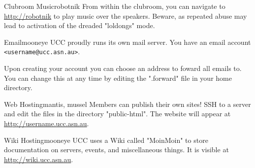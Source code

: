 
\begin{uccservice}{Clubroom Music}{robotnik}
From within the clubroom, you can navigate to \url{http://robotnik} to play music over the speakers. Beware, as repeated abuse may lead to activation of the dreaded "loldongs" mode.
\end{uccservice}

\begin{uccservice}{Email}{mooneye}
UCC proudly runs its own mail server. You have an email account \texttt{<username@ucc.asn.au>}.

Upon creating your account you can choose an address to foward all emails to. You can change this at any time by editing the ".forward" file in your home directory.
\begin{comment}
Alternately, you can use one of several methods to check your UCC email directly.
\begin{enumerate}
	\item alpine --- Connect via SSH and run "alpine".
	\item webmail --- Several options will be presented to you at \url{http://webmail.ucc.asn.au}
	\item mail client (eg: Thunderbird) --- The server name is \server{secure.ucc.asn.au}. Use port 993 and IMAP. With your UCC username and password.
\end{enumerate}
\end{comment}

\end{uccservice}

\begin{uccservice}{Web Hosting}{mantis, mussel}
Members can publish their own sites! SSH to a server and edit the files in the directory "public-html". The website will appear at \url{http://username.ucc.asn.au}.
\end{uccservice}

\begin{uccservice}{Wiki Hosting}{mooneye}
UCC uses a Wiki called "MoinMoin" to store documentation on servers, events, and miscellaneous things. It is visible at \url{http://wiki.ucc.asn.au}.
\end{uccservice}

